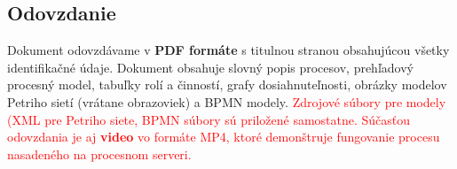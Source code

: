 \documentclass[12pt,a4paper]{article}
\begin{document}
\subsection{Odovzdanie}
Dokument odovzdávame v \textbf{PDF formáte} s titulnou
stranou obsahujúcou všetky identifikačné údaje. Dokument obsahuje slovný popis procesov, prehľadový procesný
model, tabuľky rolí a činností, grafy dosiahnuteľnosti, obrázky
modelov Petriho sietí (vrátane obrazoviek) a BPMN modely.
\textcolor{red}{Zdrojové súbory pre modely (XML pre Petriho siete, BPMN súbory sú priložené samostatne. Súčasťou odovzdania je aj \textbf{video} vo formáte MP4, ktoré demonštruje fungovanie procesu nasadeného na procesnom serveri.}
\end{document}
